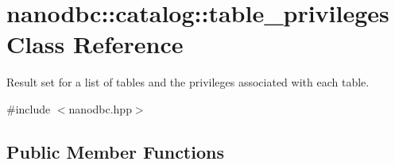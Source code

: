\hypertarget{classnanodbc_1_1catalog_1_1table__privileges}{}\section{nanodbc\+::catalog\+::table\+\_\+privileges Class Reference}
\label{classnanodbc_1_1catalog_1_1table__privileges}


Result set for a list of tables and the privileges associated with each table.  




{\ttfamily \#include $<$nanodbc.\+hpp$>$}

\subsection*{Public Member Functions}
